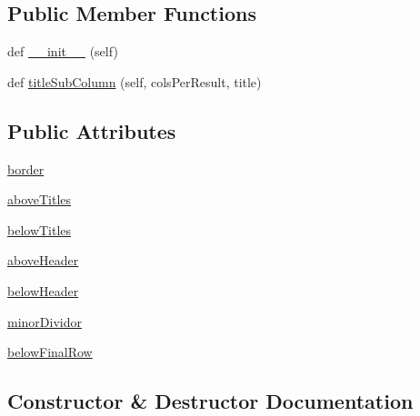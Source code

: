\subsection*{Public Member Functions}
\begin{DoxyCompactItemize}
\item 
def \mbox{\hyperlink{classgetdist_1_1types_1_1OpenTableFormatter_a33f2fb84a5fe5e5b2551ac059178b058}{\+\_\+\+\_\+init\+\_\+\+\_\+}} (self)
\item 
def \mbox{\hyperlink{classgetdist_1_1types_1_1OpenTableFormatter_a3623044047dc10b0038a8d50016816f6}{title\+Sub\+Column}} (self, cols\+Per\+Result, title)
\end{DoxyCompactItemize}
\subsection*{Public Attributes}
\begin{DoxyCompactItemize}
\item 
\mbox{\hyperlink{classgetdist_1_1types_1_1OpenTableFormatter_ad9cccdc85c79e8619c26e161b5919111}{border}}
\item 
\mbox{\hyperlink{classgetdist_1_1types_1_1OpenTableFormatter_ab5f20a86ba2a8f1c427cf85fd4568b1d}{above\+Titles}}
\item 
\mbox{\hyperlink{classgetdist_1_1types_1_1OpenTableFormatter_a4599fbdd548c6cea89c67d3982007e7d}{below\+Titles}}
\item 
\mbox{\hyperlink{classgetdist_1_1types_1_1OpenTableFormatter_aca8ede0ebc234253325688730cf90968}{above\+Header}}
\item 
\mbox{\hyperlink{classgetdist_1_1types_1_1OpenTableFormatter_a740b774d7aa62df10e7ca5cba3a68abf}{below\+Header}}
\item 
\mbox{\hyperlink{classgetdist_1_1types_1_1OpenTableFormatter_ac01e50171081f09ca90f987ba0690c06}{minor\+Dividor}}
\item 
\mbox{\hyperlink{classgetdist_1_1types_1_1OpenTableFormatter_af949adc6236499530440419c1b22681c}{below\+Final\+Row}}
\end{DoxyCompactItemize}


\subsection{Constructor \& Destructor Documentation}
\mbox{\label{classgetdist_1_1types_1_1OpenTableFormatter_a33f2fb84a5fe5e5b2551ac059178b058}} 
